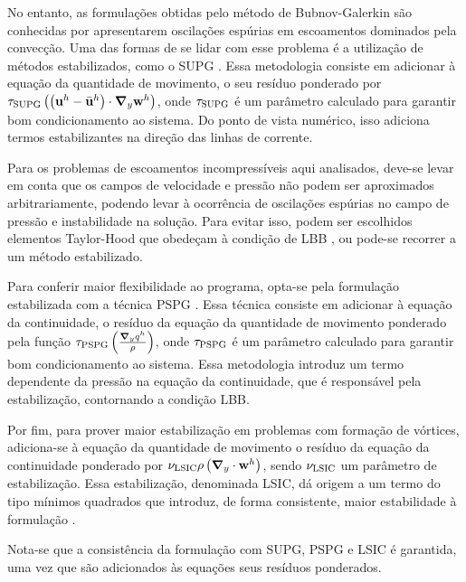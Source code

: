 No entanto, as formulações obtidas pelo método de Bubnov-Galerkin são conhecidas por apresentarem oscilações espúrias em escoamentos dominados pela convecção. Uma das formas de se lidar com esse problema é a utilização de métodos estabilizados, como o SUPG \cite{BrooksH:1982, HughesT:1984}. Essa metodologia consiste em adicionar à equação da quantidade de movimento, o seu resíduo ponderado por $\tau_{\mathrm{SUPG}} \left(\left(\mathbf{u}^h - \bar{\mathbf{u}}^h \right) \cdot \boldsymbol{\nabla}_y \mathbf{w}^h\right)$, onde $\tau_{\mathrm{SUPG}}$ é um parâmetro calculado para garantir bom condicionamento ao sistema. Do ponto de vista numérico, isso adiciona termos estabilizantes na direção das linhas de corrente.

Para os problemas de escoamentos incompressíveis aqui analisados, deve-se levar em conta que os campos de velocidade e pressão não podem ser aproximados arbitrariamente, podendo levar à ocorrência de oscilações espúrias no campo de pressão e instabilidade na solução. Para evitar isso, podem ser escolhidos elementos Taylor-Hood que obedeçam à condição de LBB \cite{BrezziF:1991,StrangF:2008,ZienkiewiczTN:2014}, ou pode-se recorrer a um método estabilizado. 

Para conferir maior flexibilidade ao programa, opta-se pela formulação estabilizada com a técnica PSPG \cite{HughesFB:1986,TezduyarMRS:1992a}. Essa técnica consiste em adicionar à equação da continuidade, o resíduo da equação da quantidade de movimento ponderado pela função $\tau_{\mathrm{PSPG}} \left(\frac{\boldsymbol{\nabla}_y q^h}{\rho}\right)$, onde $\tau_{\mathrm{PSPG}}$ é um parâmetro calculado para garantir bom condicionamento ao sistema. Essa metodologia introduz um termo dependente da pressão na equação da continuidade, que é responsável pela estabilização, contornando a condição LBB.

Por fim, para prover maior estabilização em problemas com formação de vórtices, adiciona-se à equação da quantidade de movimento o resíduo da equação da continuidade ponderado por $ \nu_{\mathrm{LSIC}} \rho \left(\boldsymbol{\nabla}_y \cdot \mathbf{w}^h\right)$, sendo $\nu_{\mathrm{LSIC}}$ um parâmetro de estabilização. Essa estabilização, denominada LSIC, dá origem a um termo do tipo mínimos quadrados que introduz, de forma consistente, maior estabilidade à formulação \cite{BazilevsTT:2013a,TezduyarO:2000}.

Nota-se que a consistência da formulação com SUPG, PSPG e LSIC é garantida, uma vez que são adicionados às equações seus resíduos ponderados. 

